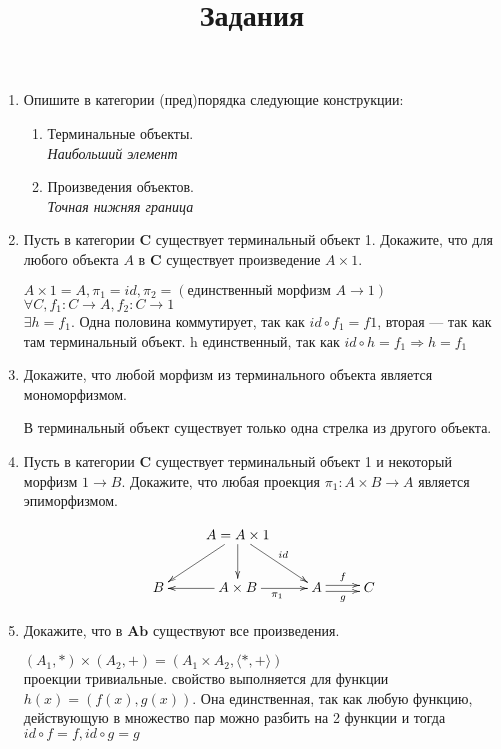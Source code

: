 \documentclass[draft]{article}
\newcommand{\cat}[1]{\mathbf{#1}}
\renewcommand{\C}{\cat{C}}
\newcommand{\Ab}{\cat{Ab}}
\begin{document}
\title{Задания}
\maketitle

\begin{enumerate}

\item Опишите в категории (пред)порядка следующие конструкции:
\begin{enumerate}
\item Терминальные объекты.\\
\textit{Наибольший элемент}
\item Произведения объектов.\\
\textit{Точная нижняя граница}
\end{enumerate}

\item Пусть в категории $\C$ существует терминальный объект 1.
Докажите, что для любого объекта $A$ в $\C$ существует произведение $A \times 1$.

$A \times 1 = A, \pi_1 = id, \pi_2 = (\textit{единственный морфизм } A \to 1)$\\
$\forall C, f_1 : C \to A, f_2: C \to 1$\\ 
$\exists h = f_1$. Одна половина коммутирует, так как $id \circ f_1 = f1$, вторая — так как там терминальный объект. h единственный, так как $id \circ h = f_1 \Rightarrow h = f_1$

\item Докажите, что любой морфизм из терминального объекта является мономорфизмом.

В терминальный объект существует только одна стрелка из другого объекта.

\item Пусть в категории $\C$ существует терминальный объект 1 и некоторый морфизм $1 \to B$.
Докажите, что любая проекция $\pi_1 : A \times B \to A$ является эпиморфизмом.

\[ \xymatrix{
& A=A\times 1 \ar[dl]\ar[dr]^{id}\ar[d] & & \\
B & A\times B \ar[l]\ar[r]_{\pi_1} & A \ar@<0.5ex>[r]^f\ar@<-.5ex>[r]_g & C
            } \]

\item Докажите, что в $\Ab$ существуют все произведения.

$(A_1, *) \times (A_2, +) = (  A_1\times  A_2 , \langle*, +\rangle  )$\\
проекции тривиальные.
свойство выполняется для функции $h(x) = (f(x), g(x))$. Она единственная, так как любую функцию, действующую в множество пар можно разбить на 2 функции и тогда $id \circ f = f, id \circ g = g$


\end{enumerate}
\end{document}
